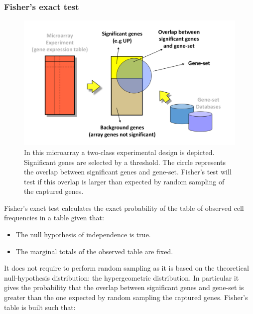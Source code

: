 		\subsubsection{Fisher's exact test}

		\begin{figure}[H]
			\centering
			\includegraphics[scale=0.2]{test_microarray}
			\caption{In this microarray a two-class experimental design is depicted. Significant genes are selected by a threshold. The circle represents the overlap between significant genes and gene-set. Fisher's test will test if this overlap is larger than expected by random sampling of the captured genes.}
			\label{fig:test-microarray}
		\end{figure}

		Fisher's exact test calculates the exact probability of the table of observed cell frequencies in a table given that:

		\begin{multicols}{2}
			\begin{itemize}
				\item The null hypothesis of independence is true.
				\item The marginal totals of the observed table are fixed.
			\end{itemize}
		\end{multicols}

		It does not require to perform random sampling as it is based on the theoretical null-hypothesis distribution: the hypergeometric distribution.
		In particular it gives the probability that the overlap between significant genes and gene-set is greater than the one expected by random sampling the captured genes.
		Fisher's table is built such that:

